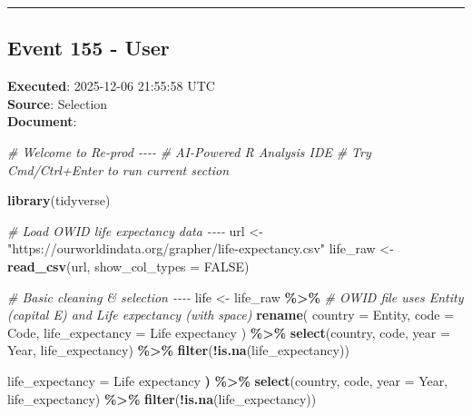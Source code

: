 \documentclass[
  11pt,
]{article}
\newenvironment{Shaded}{\begin{snugshade}}{\end{snugshade}}
\newcommand{\AttributeTok}[1]{\textcolor[rgb]{0.13,0.29,0.53}{#1}}
\newcommand{\CommentTok}[1]{\textcolor[rgb]{0.56,0.35,0.01}{\textit{#1}}}
\newcommand{\ConstantTok}[1]{\textcolor[rgb]{0.56,0.35,0.01}{#1}}
\newcommand{\ErrorTok}[1]{\textcolor[rgb]{0.64,0.00,0.00}{\textbf{#1}}}
\newcommand{\FunctionTok}[1]{\textcolor[rgb]{0.13,0.29,0.53}{\textbf{#1}}}
\newcommand{\NormalTok}[1]{#1}
\newcommand{\OtherTok}[1]{\textcolor[rgb]{0.56,0.35,0.01}{#1}}
\newcommand{\SpecialCharTok}[1]{\textcolor[rgb]{0.81,0.36,0.00}{\textbf{#1}}}
\newcommand{\StringTok}[1]{\textcolor[rgb]{0.31,0.60,0.02}{#1}}
\begin{document}
\begin{center}\rule{0.5\linewidth}{0.5pt}\end{center}

\subsection{Event 155 - User}\label{event-155---user}

\textbf{Executed}: 2025-12-06 21:55:58 UTC\\
\textbf{Source}: Selection\\
\textbf{Document}:

\begin{Shaded}
\begin{Highlighting}[]
\CommentTok{\# Welcome to Re{-}prod {-}{-}{-}{-}}
\CommentTok{\# AI{-}Powered R Analysis IDE}
\CommentTok{\# Try Cmd/Ctrl+Enter to run current section}

\FunctionTok{library}\NormalTok{(tidyverse)}

\CommentTok{\# Load OWID life expectancy data {-}{-}{-}{-}}
\NormalTok{url }\OtherTok{\textless{}{-}} \StringTok{"https://ourworldindata.org/grapher/life{-}expectancy.csv"}
\NormalTok{life\_raw }\OtherTok{\textless{}{-}} \FunctionTok{read\_csv}\NormalTok{(url, }\AttributeTok{show\_col\_types =} \ConstantTok{FALSE}\NormalTok{)}

\CommentTok{\# Basic cleaning \& selection {-}{-}{-}{-}}
\NormalTok{life }\OtherTok{\textless{}{-}}\NormalTok{ life\_raw }\SpecialCharTok{\%\textgreater{}\%}
  \CommentTok{\# OWID file uses \textasciigrave{}Entity\textasciigrave{} (capital E) and \textasciigrave{}Life expectancy\textasciigrave{} (with space)}
  \FunctionTok{rename}\NormalTok{(}
    \AttributeTok{country =}\NormalTok{ Entity,}
    \AttributeTok{code =}\NormalTok{ Code,}
    \AttributeTok{life\_expectancy =} \StringTok{\textasciigrave{}}\AttributeTok{Life expectancy}\StringTok{\textasciigrave{}}
\NormalTok{  ) }\SpecialCharTok{\%\textgreater{}\%}
  \FunctionTok{select}\NormalTok{(country, code, }\AttributeTok{year =}\NormalTok{ Year, life\_expectancy) }\SpecialCharTok{\%\textgreater{}\%}
  \FunctionTok{filter}\NormalTok{(}\SpecialCharTok{!}\FunctionTok{is.na}\NormalTok{(life\_expectancy))}

\NormalTok{    life\_expectancy }\OtherTok{=} \StringTok{\textasciigrave{}}\AttributeTok{Life expectancy}\StringTok{\textasciigrave{}}
  \ErrorTok{)} \SpecialCharTok{\%\textgreater{}\%}
  \FunctionTok{select}\NormalTok{(country, code, }\AttributeTok{year =}\NormalTok{ Year, life\_expectancy) }\SpecialCharTok{\%\textgreater{}\%}
  \FunctionTok{filter}\NormalTok{(}\SpecialCharTok{!}\FunctionTok{is.na}\NormalTok{(life\_expectancy))}
\end{Highlighting}
\end{Shaded}
\end{document}
